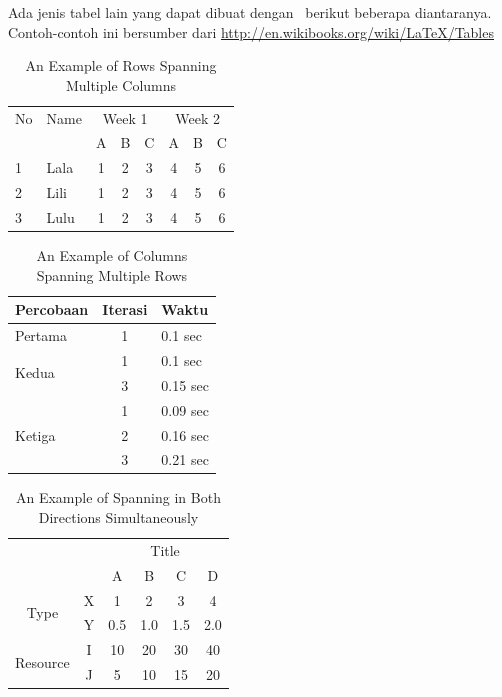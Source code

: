 Ada jenis tabel lain yang dapat dibuat dengan \latex~berikut 
beberapa diantaranya. 
Contoh-contoh ini bersumber dari 
\url{http://en.wikibooks.org/wiki/LaTeX/Tables}

\begin{table}
	\centering
	\caption{An Example of Rows Spanning Multiple Columns}
	\label{row.spanning}
	\begin{tabular}{|l|l|*{6}{c|}}
  		\hline %
  		No & Name & \multicolumn{3}{|c|}{Week 1} & \multicolumn{3}{|c|}{Week 2} \\
  		\cline{3-8} %
  		& & A & B & C & A & B & C\\
  		\hline
  		1 & Lala & 1 & 2 & 3 & 4 & 5 & 6\\
  		2 & Lili & 1 & 2 & 3 & 4 & 5 & 6\\
  		3 & Lulu & 1 & 2 & 3 & 4 & 5 & 6\\
  		\hline
	\end{tabular}
\end{table}

\begin{table}
	\centering
	\caption{An Example of Columns Spanning Multiple Rows}
	\label{column.spanning}
	\begin{tabular}{|l|c|l|}
		\hline
		Percobaan & Iterasi & Waktu \\
		\hline
		Pertama & 1 & 0.1 sec \\ \hline
		\multirow{2}{*}{Kedua} & 1 & 0.1 sec \\
 		& 3 & 0.15 sec \\ 
 		\hline
		\multirow{3}{*}{Ketiga} & 1 & 0.09 sec \\
 		& 2 & 0.16 sec \\
 		& 3 & 0.21 sec \\ 
 		\hline
	\end{tabular}
\end{table}

\begin{table}
	\centering
	\caption{An Example of Spanning in Both Directions Simultaneously}
	\label{mix.spanning}
	\begin{tabular}{cc|c|c|c|c|}
		\cline{3-6}
		& & \multicolumn{4}{|c|}{Title} \\ \cline{3-6}
		& & A & B & C & D \\ \hline
		\multicolumn{1}{|c|}{\multirow{2}{*}{Type}} &
		\multicolumn{1}{|c|}{X} & 1 & 2 & 3 & 4\\ \cline{2-6}
		\multicolumn{1}{|c|}{}                        &
		\multicolumn{1}{|c|}{Y} & 0.5 & 1.0 & 1.5 & 2.0\\ \cline{1-6}
		\multicolumn{1}{|c|}{\multirow{2}{*}{Resource}} &
		\multicolumn{1}{|c|}{I} & 10 & 20 & 30 & 40\\ \cline{2-6}
		\multicolumn{1}{|c|}{}                        &
		\multicolumn{1}{|c|}{J} & 5 & 10 & 15 & 20\\ \cline{1-6}
	\end{tabular}
\end{table}
\fi


